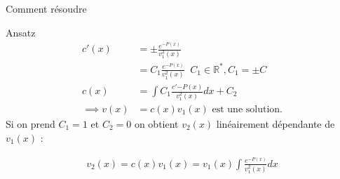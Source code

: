 \begin{parag}{Comment résoudre}
\begin{subparag}{Ansatz}
           \begin{align*}
               c'(x) &= \pm \frac{e^{-P(x)}}{v_1^2(x)} \\
                     &= C_1 \frac{e^{-P(x)}}{v_1^2(x)} \; \; C_1 \in \mathbb{R}^*, C_1 = \pm C \\ 
                   c(x) &= \int C_1 \frac{e'{-P(x)}}{v_1^2(x)}dx + C_2
                   \\
                   \implies v(x) &= c(x)v_1(x) \text{ est une solution.}
           \end{align*}
           Si on prend $C_1 = 1$ et $C_2 = 0$ on obtient $v_2(x)$ linéairement dépendante de $v_1(x)$ : 
           \begin{theoreme}
               \begin{align*}
                   v_2(x) = c(x)v_1(x) = v_1(x) \int \frac{e^{-P(x)}}{v_1^2(x)} dx
               \end{align*}
           \end{theoreme}

       \end{subparag}

   \end{parag}


